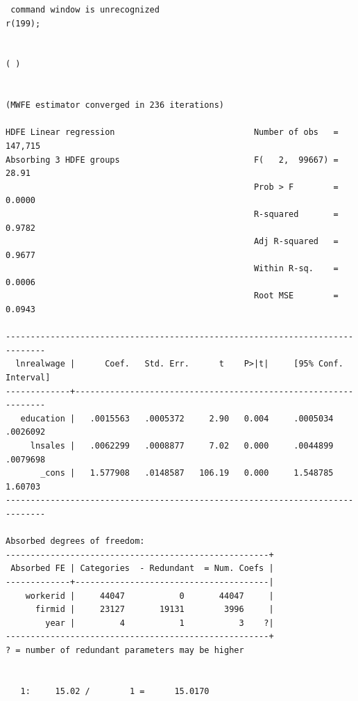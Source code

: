 \documentclass[
  12pt,
]{article}
\newenvironment{Shaded}{\begin{snugshade}}{\end{snugshade}}
\newcommand{\KeywordTok}[1]{\textcolor[rgb]{0.13,0.29,0.53}{\textbf{#1}}}
\newcommand{\NormalTok}[1]{#1}
\newcommand{\OperatorTok}[1]{\textcolor[rgb]{0.81,0.36,0.00}{\textbf{#1}}}
\newcommand{\StringTok}[1]{\textcolor[rgb]{0.31,0.60,0.02}{#1}}
\begin{document}
\begin{verbatim}
 command window is unrecognized
r(199);


( )


(MWFE estimator converged in 236 iterations)

HDFE Linear regression                            Number of obs   =    147,715
Absorbing 3 HDFE groups                           F(   2,  99667) =      28.91
                                                  Prob > F        =     0.0000
                                                  R-squared       =     0.9782
                                                  Adj R-squared   =     0.9677
                                                  Within R-sq.    =     0.0006
                                                  Root MSE        =     0.0943

------------------------------------------------------------------------------
  lnrealwage |      Coef.   Std. Err.      t    P>|t|     [95% Conf. Interval]
-------------+----------------------------------------------------------------
   education |   .0015563   .0005372     2.90   0.004     .0005034    .0026092
     lnsales |   .0062299   .0008877     7.02   0.000     .0044899    .0079698
       _cons |   1.577908   .0148587   106.19   0.000     1.548785     1.60703
------------------------------------------------------------------------------

Absorbed degrees of freedom:
-----------------------------------------------------+
 Absorbed FE | Categories  - Redundant  = Num. Coefs |
-------------+---------------------------------------|
    workerid |     44047           0       44047     |
      firmid |     23127       19131        3996     |
        year |         4           1           3    ?|
-----------------------------------------------------+
? = number of redundant parameters may be higher


   1:     15.02 /        1 =      15.0170
\end{verbatim}

\begin{Shaded}
\end{Shaded}
\end{document}
